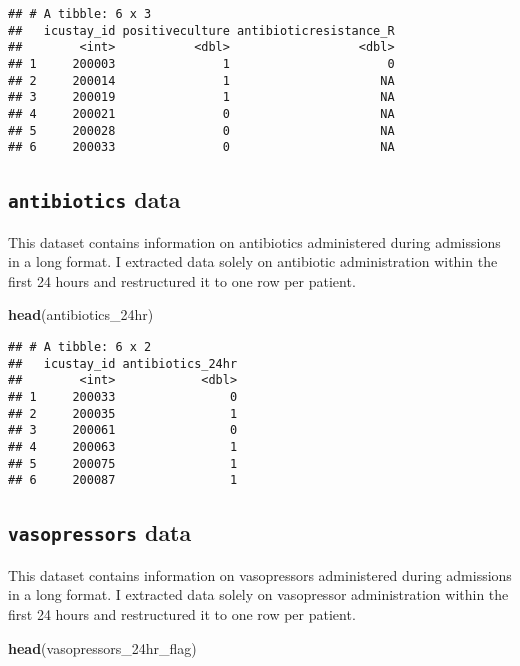 \documentclass[
]{article}
\newenvironment{Shaded}{\begin{snugshade}}{\end{snugshade}}
\newcommand{\FunctionTok}[1]{\textcolor[rgb]{0.13,0.29,0.53}{\textbf{#1}}}
\newcommand{\NormalTok}[1]{#1}
\begin{document}
\begin{verbatim}
## # A tibble: 6 x 3
##   icustay_id positiveculture antibioticresistance_R
##        <int>           <dbl>                  <dbl>
## 1     200003               1                      0
## 2     200014               1                     NA
## 3     200019               1                     NA
## 4     200021               0                     NA
## 5     200028               0                     NA
## 6     200033               0                     NA
\end{verbatim}

\hypertarget{antibiotics-data}{%
\subsection{\texorpdfstring{\texttt{antibiotics}
data}{antibiotics data}}\label{antibiotics-data}}

This dataset contains information on antibiotics administered during
admissions in a long format. I extracted data solely on antibiotic
administration within the first 24 hours and restructured it to one row
per patient.

\begin{Shaded}
\begin{Highlighting}[]
\FunctionTok{head}\NormalTok{(antibiotics\_24hr)}
\end{Highlighting}
\end{Shaded}

\begin{verbatim}
## # A tibble: 6 x 2
##   icustay_id antibiotics_24hr
##        <int>            <dbl>
## 1     200033                0
## 2     200035                1
## 3     200061                0
## 4     200063                1
## 5     200075                1
## 6     200087                1
\end{verbatim}

\hypertarget{vasopressors-data}{%
\subsection{\texorpdfstring{\texttt{vasopressors}
data}{vasopressors data}}\label{vasopressors-data}}

This dataset contains information on vasopressors administered during
admissions in a long format. I extracted data solely on vasopressor
administration within the first 24 hours and restructured it to one row
per patient.

\begin{Shaded}
\begin{Highlighting}[]
\FunctionTok{head}\NormalTok{(vasopressors\_24hr\_flag)}
\end{Highlighting}
\end{Shaded}
\end{document}
